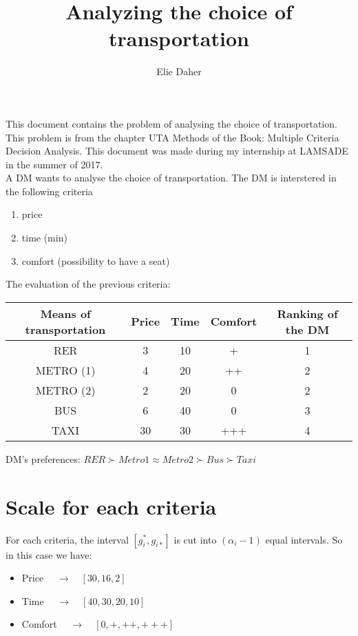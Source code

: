 \documentclass{article}
\title{Analyzing the choice of transportation}
\author{Elie Daher}
\begin{document}
\maketitle
\abstract This document contains the problem of analysing the choice of transportation. This problem is from the chapter UTA Methods of the Book: Multiple Criteria Decision Analysis. This document was made during my internship at LAMSADE in the summer of 2017.\\

A DM wants to analyse the choice of transportation. The DM is interstered in the following criteria 
\begin{enumerate}
\item price
\item time (min)
\item comfort (possibility to have a seat)
\end{enumerate}\leavevmode

The evaluation of the previous criteria:
\begin{center}
\begin{tabular}{ |c|c|c|c|c| } 
\hline
Means of transportation & Price & Time & Comfort & Ranking of the DM \\
\hline
RER & 3 & 10 & + & 1 \\
METRO (1) & 4 & 20 & ++ & 2 \\
METRO (2) & 2 & 20 & 0 & 2 \\
BUS & 6 & 40 & 0 & 3 \\
TAXI & 30 & 30 & +++ & 4 \\
\hline
\end{tabular}
\end{center}

DM's preferences: $ RER \succ  Metro1 \approx Metro2  \succ  Bus \succ  Taxi$\\

\newpage

\section{Scale for each criteria}
For each criteria, the interval $[g_i^{*}, g_{i*}]$ is cut into $(\alpha _i -1)$ equal intervals. So in this case we have: 
\begin{itemize}
\item Price  $\quad \rightarrow \quad [30, 16, 2]$
\item Time  $\quad \rightarrow \quad [40, 30, 20, 10]$
\item Comfort  $\quad \rightarrow \quad [0, +, ++, +++]$
\end{itemize}
\end{document}
